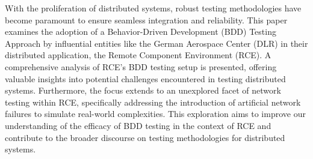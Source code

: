 With the proliferation of distributed systems, robust testing methodologies have become paramount to ensure seamless integration and reliability. This paper examines the adoption of a Behavior-Driven Development (BDD) Testing Approach by influential entities like the German Aerospace Center (DLR) in their distributed application, the Remote Component Environment (RCE). A comprehensive analysis of RCE's BDD testing setup is presented, offering valuable insights into potential challenges encountered in testing distributed systems. Furthermore, the focus extends to an unexplored facet of network testing within RCE, specifically addressing the introduction of artificial network failures to simulate real-world complexities. This exploration aims to improve our understanding of the efficacy of BDD testing in the context of RCE and contribute to the broader discourse on testing methodologies for distributed systems.